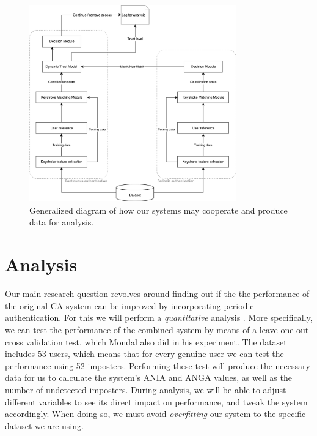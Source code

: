 \documentclass[informationsecurity]{gucmasterproject}
\begin{document}
\begin{figure}[h]
    \centering
    \includegraphics[width=0.8\textwidth]{system-diagram.pdf}
    \caption{Generalized diagram of how our systems may cooperate and produce data for analysis.}
    \label{fig:system-diagram}
\end{figure}


%
    
%

%


\section{Analysis}
Our main research question revolves around finding out if the the performance of the original CA system can be improved by incorporating periodic authentication.
For this we will perform a \textit{quantitative} analysis \cite{leedy_ormrod_2013}.
More specifically, we can test the performance of the combined system by means of a leave-one-out cross validation test, which Mondal also did in his experiment.
The dataset includes 53 users, which means that for every genuine user we can test the performance using 52 imposters.
Performing these test will produce the necessary data for us to calculate the system's ANIA and ANGA values, as well as the number of undetected imposters.
During analysis, we will be able to adjust different variables to see its direct impact on performance, and tweak the system accordingly.
When doing so, we must avoid \textit{overfitting} our system to the specific dataset we are using.
\end{document}
